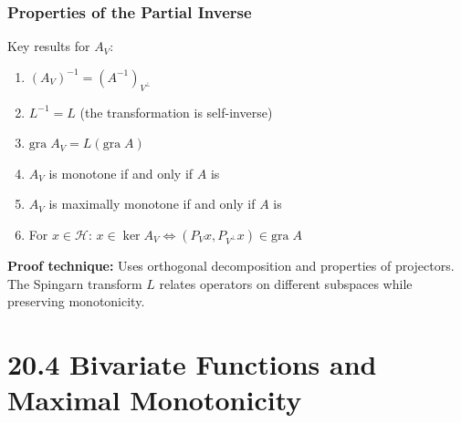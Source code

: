 \documentclass[aspectratio=169,10pt]{beamer}
\newcommand{\gra}{\mathrm{gra}\;}
\newcommand{\Hilbert}{\mathcal{H}}
\begin{document}
\begin{frame}
    \frametitle{Properties of the Partial Inverse}

    \begin{theorem}
        Key results for $A_V$:
        \begin{enumerate}
            \item[(i)] $(A_V)^{-1} = (A^{-1})_{V^\perp}$
            \item[(ii)] $L^{-1} = L$ (the transformation is self-inverse)
            \item[(iii)] $\gra A_V = L(\gra A)$
            \item[(iv)] $A_V$ is monotone if and only if $A$ is
            \item[(v)] $A_V$ is maximally monotone if and only if $A$ is
            \item[(vi)] For $x \in \Hilbert$: $x \in \ker A_V \Leftrightarrow (P_V x, P_{V^\perp} x) \in \gra A$
        \end{enumerate}
    \end{theorem}

    \vspace{1em}

    \textbf{Proof technique:} Uses orthogonal decomposition and properties of projectors.
    The Spingarn transform $L$ relates operators on different subspaces while preserving monotonicity.
\end{frame}

\section{20.4 Bivariate Functions and Maximal Monotonicity}
\end{document}
